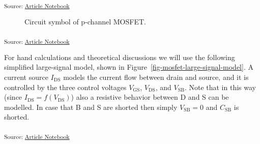 \documentclass[
  a4paper,
  DIV=11,
  numbers=noendperiod]{scrartcl}
\begin{document}
\textsubscript{Source:
\href{https://iic-jku.github.io/analog-circuit-design/index.qmd.html}{Article
Notebook}}

\begin{figure}[H]


\caption{\label{fig-pmos-symbol}Circuit symbol of p-channel MOSFET.}

\end{figure}%

\textsubscript{Source:
\href{https://iic-jku.github.io/analog-circuit-design/index.qmd.html}{Article
Notebook}}

For hand calculations and theoretical discussions we will use the
following simplified large-signal model, shown in
Figure~\ref{fig-mosfet-large-signal-model}. A current source
\(I_\mathrm{DS}\) models the current flow between drain and source, and
it is controlled by the three control voltages \(V_\mathrm{GS}\),
\(V_\mathrm{DS}\), and \(V_\mathrm{SB}\). Note that in this way (since
\(I_\mathrm{DS}= f(V_\mathrm{DS})\)) also a resistive behavior between D
and S can be modelled. In case that B and S are shorted then simply
\(V_\mathrm{SB} = 0\) and \(C_\mathrm{SB}\) is shorted.

\textsubscript{Source:
\href{https://iic-jku.github.io/analog-circuit-design/index.qmd.html}{Article
Notebook}}
\end{document}
